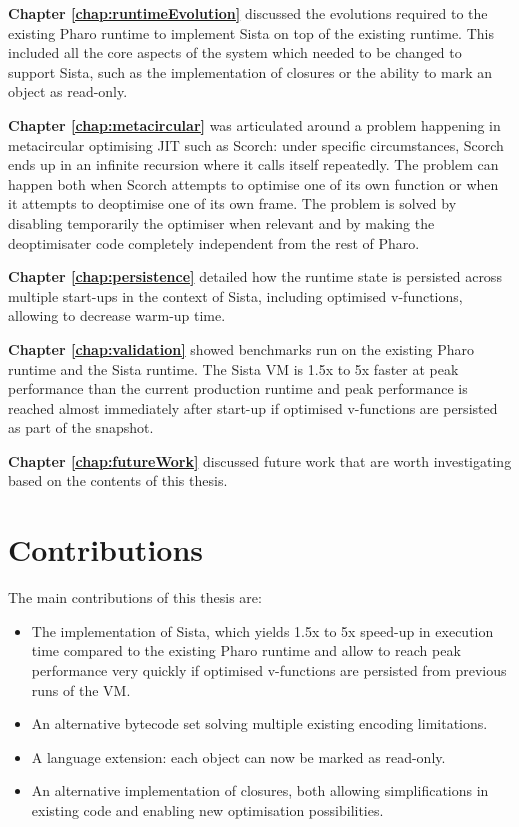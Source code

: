 \documentclass[a4paper,12pt,twoside]{../includes/ThesisStyle}
\begin{document}
\textbf{Chapter \ref{chap:runtimeEvolution}} discussed the evolutions required to the existing Pharo runtime to implement Sista on top of the existing runtime. This included all the core aspects of the system which needed to be changed to support Sista, such as the implementation of closures or the ability to mark an object as read-only.

\textbf{Chapter \ref{chap:metacircular}} was articulated around a problem happening in metacircular optimising JIT such as Scorch: under specific circumstances, Scorch ends up in an infinite recursion where it calls itself repeatedly. The problem can happen both when Scorch attempts to optimise one of its own function or when it attempts to deoptimise one of its own frame. The problem is solved by disabling temporarily the optimiser when relevant and by making the deoptimisater code completely independent from the rest of Pharo.

\textbf{Chapter \ref{chap:persistence}} detailed how the runtime state is persisted across multiple start-ups in the context of Sista, including optimised v-functions, allowing to decrease warm-up time. 

\textbf{Chapter \ref{chap:validation}} showed benchmarks run on the existing Pharo runtime and the Sista runtime. The Sista VM is 1.5x to 5x faster at peak performance than the current production runtime and peak performance is reached almost immediately after start-up if optimised v-functions are persisted as part of the snapshot.

\textbf{Chapter \ref{chap:futureWork}} discussed future work that are worth investigating based on the contents of this thesis.

\section{Contributions}

The main contributions of this thesis are:
\begin{itemize}
	\item The implementation of Sista, which yields 1.5x to 5x speed-up in execution time compared to the existing Pharo runtime and allow to reach peak performance very quickly if optimised v-functions are persisted from previous runs of the VM.
	\item An alternative bytecode set solving multiple existing encoding limitations.
	\item A language extension: each object can now be marked as read-only.
	\item An alternative implementation of closures, both allowing simplifications in existing code and enabling new optimisation possibilities.
\end{itemize}
\end{document}
